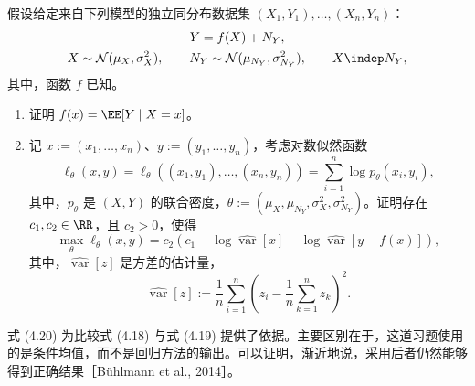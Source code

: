 \begin{problem}[最大似然]
假设给定来自下列模型的独立同分布数据集 $(X_1,Y_1),\ldots,(X_n,Y_n)$：
\[
 \begin{gathered}
 Y=f(X)+N_Y,\\
 X\sim\mathcal N(\mu_X,\sigma_X^2),\qquad
 N_Y\sim\mathcal N(\mu_{N_Y},\sigma_{N_Y}^2),\qquad X\indep N_Y,
 \end{gathered}
\]
其中，函数 $f$ 已知。
\begin{enumerate}[label=\alph*)]
 \item 证明 $f(x)=\EE[Y\mid X=x]$。
 \item 记 $x:=(x_1,\ldots,x_n)$、$y:=(y_1,\ldots,y_n)$，考虑对数似然函数
 \[
  \ell_\theta(x,y)
  =\ell_\theta((x_1,y_1),\ldots,(x_n,y_n))
  =\sum_{i=1}^n\log p_\theta(x_i,y_i),
 \]
 其中，$p_\theta$ 是 $(X,Y)$ 的联合密度，$\theta:=(\mu_X,\mu_{N_Y},\sigma_X^2,\sigma_{N_Y}^2)$。证明存在 $c_1,c_2\in\RR$，且 $c_2>0$，使得
 \begin{equation}
  \max_\theta\ell_\theta(x,y)
  =c_2\left(c_1-\log\widehat{\operatorname{var}}[x]
    -\log\widehat{\operatorname{var}}[y-f(x)]\right),
  \tag{4.20}
 \end{equation}
 其中，$\widehat{\operatorname{var}}[z]$ 是方差的估计量，
 \[
  \widehat{\operatorname{var}}[z]
  :=\frac{1}{n}\sum_{i=1}^n
  \left(z_i-\frac{1}{n}\sum_{k=1}^nz_k\right)^2.
 \]
\end{enumerate}
\end{problem}

式 (4.20) 为比较式 (4.18) 与式 (4.19) 提供了依据。主要区别在于，这道习题使用的是条件均值，而不是回归方法的输出。可以证明，渐近地说，采用后者仍然能够得到正确结果［Bühlmann et al., 2014］。
